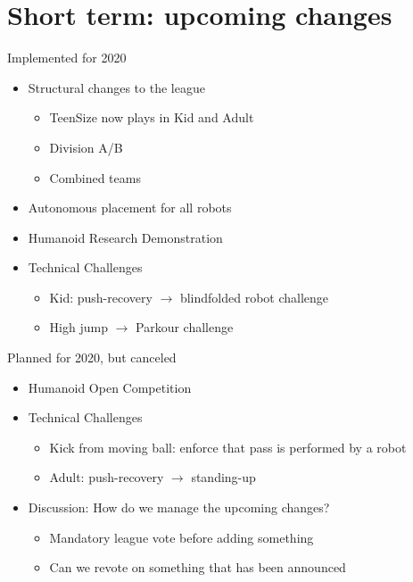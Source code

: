 \documentclass[xcolor=dvipsnames]{beamer}
\begin{document}
\section{Short term: upcoming changes}

\begin{frame}{Implemented for 2020}
  \begin{itemize}
  \item Structural changes to the league
    \begin{itemize}
    \item TeenSize now plays in Kid and Adult
    \item Division A/B
    \item Combined teams
    \end{itemize}
  \item Autonomous placement for all robots
  \item Humanoid Research Demonstration
  \item Technical Challenges
    \begin{itemize}
    \item Kid: push-recovery $\rightarrow$ blindfolded robot challenge
    \item High jump $\rightarrow$ Parkour challenge
    \end{itemize}
  \end{itemize}
\end{frame}

\begin{frame}{Planned for 2020, but canceled}
  \begin{itemize}
  \item Humanoid Open Competition
  \item Technical Challenges
    \begin{itemize}
    \item Kick from moving ball: enforce that pass is performed by a robot
    \item Adult: push-recovery $\rightarrow$ standing-up
    \end{itemize}
  \item Discussion: How do we manage the upcoming changes?
    \begin{itemize}
    \item Mandatory league vote before adding something
    \item Can we revote on something that has been announced
    \end{itemize}
  \end{itemize}
\end{frame}
\end{document}
